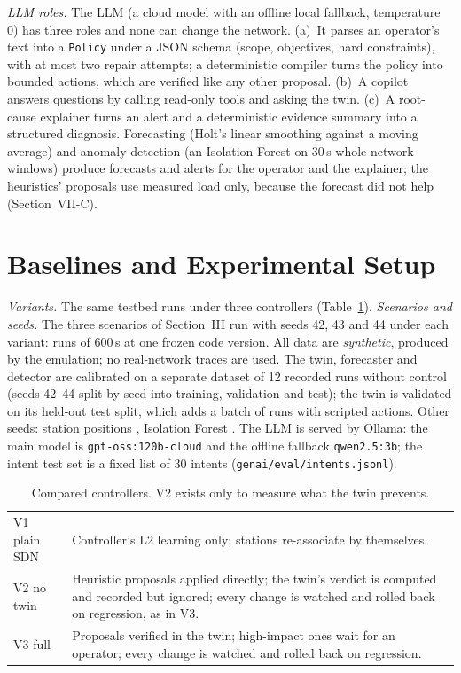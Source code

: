 \documentclass[conference]{IEEEtran}
\begin{document}
\emph{LLM roles.} The LLM (a cloud model with an offline local fallback, temperature 0) has three roles and none can change the network. (a)~It parses an operator's text into a \texttt{Policy} under a JSON schema (scope, objectives, hard constraints), with at most two repair attempts; a deterministic compiler turns the policy into bounded actions, which are verified like any other proposal. (b)~A copilot answers questions by calling read-only tools and asking the twin. (c)~A root-cause explainer turns an alert and a deterministic evidence summary into a structured diagnosis. Forecasting (Holt's linear smoothing \cite{holt2004} against a moving average) and anomaly detection (an Isolation Forest \cite{liu2008} on 30\,s whole-network windows) produce forecasts and alerts for the operator and the explainer; the heuristics' proposals use measured load only, because the forecast did not help (Section~VII-C).

\section{Baselines and Experimental Setup}
\emph{Variants.} The same testbed runs under three controllers (Table~\ref{tab:variants}). \emph{Scenarios and seeds.} The three scenarios of Section~III run with seeds 42, 43 and 44 under each variant: \NumRuns{} runs of 600\,s at one frozen code version. All data are \emph{synthetic}, produced by the emulation; no real-network traces are used. The twin, forecaster and detector are calibrated on a separate dataset of 12 recorded runs without control (seeds 42--44 split by seed into training, validation and test); the twin is validated on its held-out test split, which adds a batch of runs with scripted actions. Other seeds: station positions \CfgStationSeed, Isolation Forest \CfgForestSeed. The LLM is served by Ollama: the main model is \texttt{gpt-oss:120b-cloud} and the offline fallback \texttt{qwen2.5:3b}; the intent test set is a fixed list of 30 intents (\texttt{genai/eval/intents.jsonl}).

\begin{table}[t]
\caption{Compared controllers. V2 exists only to measure what the twin prevents.}
\label{tab:variants}
\centering\small
\begin{tabular}{@{}lp{6.2cm}@{}}
\toprule
V1 plain SDN & Controller's L2 learning only; stations re-associate by themselves.\\
V2 no twin & Heuristic proposals applied directly; the twin's verdict is computed and recorded but ignored; every change is watched and rolled back on regression, as in V3.\\
V3 full & Proposals verified in the twin; high-impact ones wait for an operator; every change is watched and rolled back on regression.\\
\bottomrule
\end{tabular}
\end{table}
\end{document}
